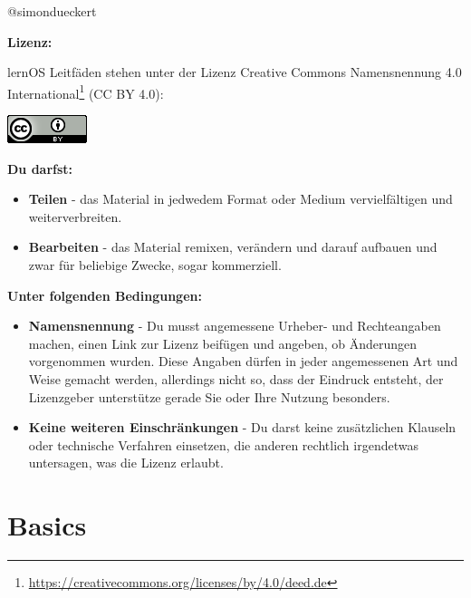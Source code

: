 \documentclass[
  ngerman,
  paper=a4,
,captions=tableheading
]{scrartcl}
\DeclareRobustCommand{\href}[2]{#2\footnote{\url{#1}}}
\providecommand{\tightlist}{%
  \setlength{\itemsep}{0pt}\setlength{\parskip}{0pt}}
\begin{document}
@simondueckert

\textbf{Lizenz:}

lernOS Leitfäden stehen unter der Lizenz
\href{https://creativecommons.org/licenses/by/4.0/deed.de}{Creative
Commons Namensnennung 4.0 International} (CC BY 4.0):

\includegraphics{./tex2pdf.-c0ed5a8631023970/d18286abe9c5f984f58813bfa721e63381b92a7a.png}

\textbf{Du darfst:}

\begin{itemize}
\tightlist
\item
  \textbf{Teilen} - das Material in jedwedem Format oder Medium
  vervielfältigen und weiterverbreiten.
\item
  \textbf{Bearbeiten} - das Material remixen, verändern und darauf
  aufbauen und zwar für beliebige Zwecke, sogar kommerziell.
\end{itemize}

\textbf{Unter folgenden Bedingungen:}

\begin{itemize}
\tightlist
\item
  \textbf{Namensnennung} - Du musst angemessene Urheber- und
  Rechteangaben machen, einen Link zur Lizenz beifügen und angeben, ob
  Änderungen vorgenommen wurden. Diese Angaben dürfen in jeder
  angemessenen Art und Weise gemacht werden, allerdings nicht so, dass
  der Eindruck entsteht, der Lizenzgeber unterstütze gerade Sie oder
  Ihre Nutzung besonders.
\item
  \textbf{Keine weiteren Einschränkungen} - Du darst keine zusätzlichen
  Klauseln oder technische Verfahren einsetzen, die anderen rechtlich
  irgendetwas untersagen, was die Lizenz erlaubt.
\end{itemize}

\hypertarget{basics}{%
\section{Basics}\label{basics}}
\end{document}
